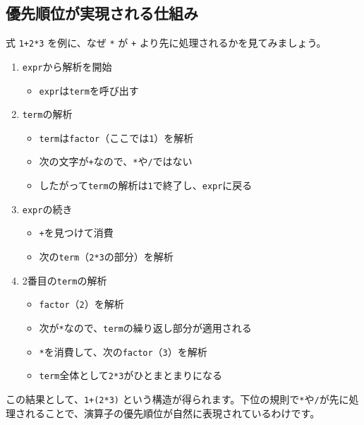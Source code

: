 \subsection{優先順位が実現される仕組み}

式 \texttt{1+2*3} を例に、なぜ \texttt{*} が \texttt{+}
より先に処理されるかを見てみましょう。

\begin{enumerate}
\item
  \texttt{expr}から解析を開始

\begin{itemize}
\item
  \texttt{expr}は\texttt{term}を呼び出す
\end{itemize}

\item
  \texttt{term}の解析

\begin{itemize}
\item
  \texttt{term}は\texttt{factor}（ここでは\texttt{1}）を解析
\item
  次の文字が\texttt{+}なので、\texttt{*}や\texttt{/}ではない
\item
  したがって\texttt{term}の解析は\texttt{1}で終了し、\texttt{expr}に戻る
\end{itemize}

\item
  \texttt{expr}の続き

\begin{itemize}
\item
  \texttt{+}を見つけて消費
\item
  次の\texttt{term}（\texttt{2*3}の部分）を解析
\end{itemize}

\item
  2番目の\texttt{term}の解析

\begin{itemize}
\item
  \texttt{factor}（\texttt{2}）を解析
\item
  次が\texttt{*}なので、\texttt{term}の繰り返し部分が適用される
\item
  \texttt{*}を消費して、次の\texttt{factor}（\texttt{3}）を解析
\item
  \texttt{term}全体として\texttt{2*3}がひとまとまりになる
\end{itemize}
\end{enumerate}

この結果として、\texttt{1+(2*3)}
という構造が得られます。下位の規則で\texttt{*}や\texttt{/}が先に処理されることで、演算子の優先順位が自然に表現されているわけです。

